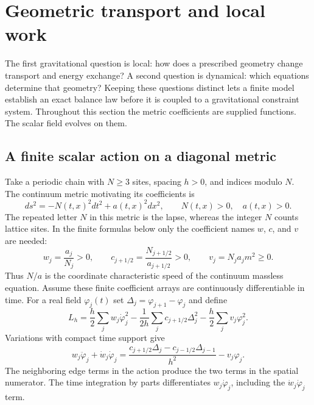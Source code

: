 \section{Geometric transport and local work}
\label{c:core:transport}

The first gravitational question is local: how does a prescribed geometry
change transport and energy exchange? A second question is dynamical: which
equations determine that geometry? Keeping these questions distinct lets a
finite model establish an exact balance law before it is coupled to a
gravitational constraint system. Throughout this section the metric
coefficients are supplied functions. The scalar field evolves on them.

\subsection{A finite scalar action on a diagonal metric}

Take a periodic chain with $N\geq3$ sites, spacing $h>0$, and indices modulo
$N$. The continuum metric motivating its coefficients is
\[
 ds^2=-N(t,x)^2dt^2+a(t,x)^2dx^2,
 \qquad N(t,x)>0,\quad a(t,x)>0.
\]
The repeated letter $N$ in this metric is the lapse, whereas the integer
$N$ counts lattice sites. In the finite formulas below only the coefficient
names $w$, $c$, and $v$ are needed:
\[
 w_j=\frac{a_j}{N_j}>0,\qquad
 c_{j+1/2}=\frac{N_{j+1/2}}{a_{j+1/2}}>0,\qquad
 v_j=N_ja_jm^2\geq0.
\]
Thus $N/a$ is the coordinate characteristic speed of the continuum
massless equation. Assume these finite coefficient arrays are continuously
differentiable in time. For a real field $\varphi_j(t)$ set
$\Delta_j=\varphi_{j+1}-\varphi_j$ and define
\begin{equation}
 L_h=\frac h2\sum_jw_j\dot\varphi_j^2
 -\frac1{2h}\sum_jc_{j+1/2}\Delta_j^2
 -\frac h2\sum_jv_j\varphi_j^2.
 \label{c:core:scalar-action}
\end{equation}
Variations with compact time support give
\begin{equation}
 w_j\ddot\varphi_j+\dot w_j\dot\varphi_j
 =\frac{c_{j+1/2}\Delta_j-c_{j-1/2}\Delta_{j-1}}{h^2}
 -v_j\varphi_j.
 \label{c:core:scalar-evolution}
\end{equation}
The neighboring edge terms in the action produce the two terms in the
spatial numerator. The time integration by parts differentiates
$w_j\dot\varphi_j$, including the $\dot w_j\dot\varphi_j$ term.

